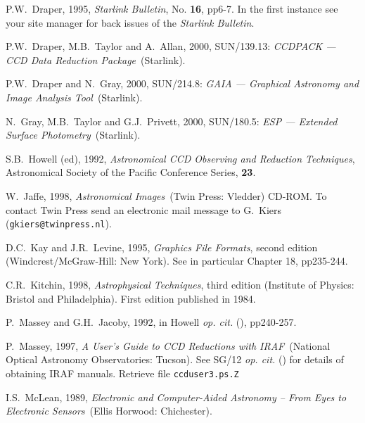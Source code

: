 \documentclass[twoside,11pt]{article}
\newcommand{\htmladdnormallink}[2]{#1}
\newenvironment{latexonly}{}{}
\newcommand{\xref}[3]{#1}
\begin{document}
\begin{thebibliography}{99}
   P.W.~Draper, 1995, 
  \htmladdnormallink{{\it Starlink Bulletin}}
   {http://star-www.rl.ac.uk//bulletin.html},
   No. {\bf 16}, pp6-7.  In the first instance see your site manager
   for back issues of the {\it Starlink Bulletin}.

   P.W.~Draper, M.B.~Taylor and A.~Allan, 2000,
   \xref{SUN/139.13}{sun139}{}: {\it CCDPACK --- CCD Data Reduction
   Package}\, (Starlink).

   P.W.~Draper and N.~Gray, 2000,
   \xref{SUN/214.8}{sun214}{}: {\it GAIA --- Graphical Astronomy and Image
   Analysis Tool}\, (Starlink).

   N.~Gray, M.B.~Taylor and G.J.~Privett, 2000,
   \xref{SUN/180.5}{sun180}{}: {\it ESP --- Extended Surface Photometry}\,
   (Starlink).

   S.B.~Howell (ed), 1992, {\it Astronomical CCD
   Observing and Reduction Techniques}, Astronomical Society of the
   Pacific Conference Series, {\bf 23}.

   W.~Jaffe, 1998, {\it Astronomical Images}\,
   (Twin Press: Vledder) CD-ROM.  To contact Twin Press send an electronic
   mail message to G.~Kiers ({\tt gkiers@twinpress.nl}).

   D.C.~Kay and J.R.~Levine, 1995, {\it Graphics File
   Formats}, second edition
  \newline (Windcrest/McGraw-Hill: New York).  See in particular
   Chapter 18, pp235-244.

   C.R.~Kitchin, 1998, {\it Astrophysical Techniques},
   third edition (Institute of Physics: Bristol and Philadelphia).
   First edition published in 1984.

   P.~Massey and G.H.~Jacoby, 1992, in Howell
   {\it op. cit.}\/ (\cite{HOWELL92}), pp240-257.

   P.~Massey, 1997, {\it A User's Guide to CCD
   Reductions with IRAF}\, (National Optical Astronomy Observatories:
   Tucson).  See \xref{SG/12}{sg12}{} {\it op. cit.}\/ (\cite{SG12}) for
   details of obtaining IRAF manuals.  Retrieve file {\tt ccduser3.ps.Z}

   I.S.~McLean, 1989, {\it Electronic and Computer-Aided
   Astronomy -- From Eyes to Electronic Sensors}\, (Ellis Horwood:
   Chichester).


\end{thebibliography}
\end{document}
